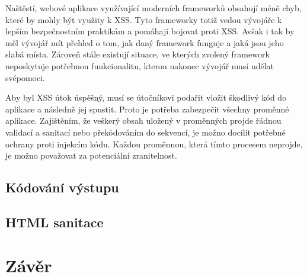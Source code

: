 \documentclass[11pt,conference, a4paper]{IEEEtran}
\begin{document}

Naštěstí, webové aplikace využívající moderních frameworků obsahují méně chyb, které by mohly být využity k XSS. Tyto frameworky totiž vedou vývojáře k lepším bezpečnostním praktikám a pomáhají bojovat proti XSS. Avšak i tak by měl vývojář mít přehled o tom, jak daný framework funguje a jaká jsou jeho slabá místa. Zároveň stále existují situace, ve kterých zvolený framework neposkytuje potřebnou funkcionalitu, kterou nakonec vývojář musí udělat svépomoci.


Aby byl XSS útok úspěšný, musí se útočníkovi podařit vložit škodlivý kód do aplikace a následně jej spustit. Proto je potřeba zabezpečit všechny proměnné aplikace. Zajištěním, že veškerý obsah uložený v proměnných projde řádnou validací a sanitací nebo překódováním do  sekvencí, je možno docílit potřebné ochrany proti injekcím kódu. Každou proměnnou, která tímto procesem neprojde, je možno považovat za potenciální zranitelnost.

\subsection{Kódování výstupu} %

\subsection{HTML sanitace} %





\section{Závěr}


\newpage
  
  
\end{document}
